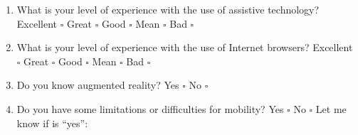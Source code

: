 \begin{enumerate}
\item What is your level of experience with the use of assistive technology?
\newline Excellent $\square$ Great $\square$ Good $\square$ Mean $\square$ Bad $\square$

\item What is your level of experience with the use of Internet browsers?
\newline Excellent $\square$ Great $\square$ Good $\square$ Mean $\square$ Bad $\square$
\item Do you know augmented reality?
\newline Yes $\square$ No $\square$
\item Do you have some limitations or difficulties for mobility?
\newline Yes $\square$ No $\square$ Let me know if is ``yes'':
\end{enumerate}

